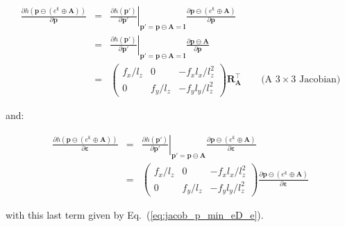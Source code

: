 \documentclass[a4paper,11pt]{report}
\newcommand{\E}{{\bm{\varepsilon}}}
\newcommand{\A}{{\mathbf{A}}}
\begin{document}
\begin{eqnarray}
\frac{\partial h(\mathbf{p} \ominus (e^\E \oplus \A) )}{\partial \mathbf{p}} 
&=& 
\left. \frac{\partial h(\mathbf{p'})}{\partial \mathbf{p'}} \right|_{ \mathbf{p'} = \mathbf{p} \ominus \A = \mathbf{l} }
\frac{\partial \mathbf{p} \ominus (e^\E \oplus \A) }{\partial \mathbf{p}} \\
&=& 
\left. \frac{\partial h(\mathbf{p'})}{\partial \mathbf{p'}} \right|_{ \mathbf{p'} = \mathbf{p} \ominus \A = \mathbf{l} }
\frac{\partial \mathbf{p} \ominus \A }{\partial \mathbf{p}} \\
&=&
\left(
\begin{array}{ccc}
 f_x / l_z   &    0    &  -f_x l_x / l_z^2   \\
 0 & f_y / l_z  &  -f_y l_y / l_z^2   
\end{array}
\right)
\mathbf{R_A^\top} 
\quad\quad \text{(A $3 \times 3$ Jacobian)}
\end{eqnarray}

\noindent and:

\begin{eqnarray}
\frac{\partial h(\mathbf{p} \ominus (e^\E \oplus \A) )}{\partial \E} 
&=& 
\left. \frac{\partial h(\mathbf{p'})}{\partial \mathbf{p'}} \right|_{ \mathbf{p'} = \mathbf{p} \ominus \A }
\frac{\partial \mathbf{p} \ominus (e^\E \oplus \A) }{\partial \E} \\
&=& 
\left(
\begin{array}{ccc}
 f_x / l_z   &    0    &  -f_x l_x / l_z^2   \\
 0 & f_y / l_z  &  -f_y l_y / l_z^2   
\end{array}
\right)
\frac{\partial \mathbf{p} \ominus (e^\E \oplus \A) }{\partial \E}
\end{eqnarray}

\noindent with this last term given by Eq.~(\ref{eq:jacob_p_min_eD_e}).




\end{document}
